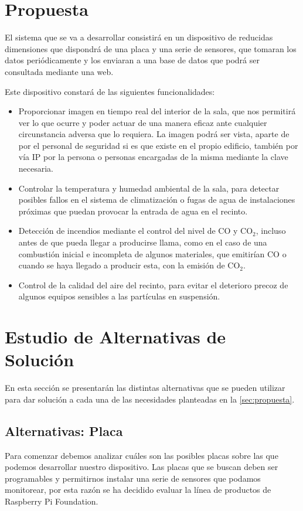 \section{Propuesta}\label{sec:propuesta}
El sistema que se va a desarrollar consistirá en un dispositivo de reducidas dimensiones que dispondrá de una placa y una serie de sensores, que tomaran los datos periódicamente y los enviaran a una base de datos que podrá ser consultada mediante una web.

Este dispositivo constará de las siguientes funcionalidades:
\begin{itemize}
	\item Proporcionar imagen en tiempo real del interior de la sala, que nos permitirá ver lo que ocurre y poder actuar de una manera eficaz ante cualquier circunstancia adversa que lo requiera. La imagen podrá ser vista, aparte de por el personal de seguridad si es que existe en el propio edificio, también por vía IP por la persona o personas encargadas de la misma mediante la clave necesaria.
	\item Controlar la temperatura y humedad ambiental de la sala, para detectar posibles fallos en el sistema de climatización o fugas de agua de instalaciones próximas que puedan provocar la entrada de agua en el recinto.
	\item Detección de incendios mediante el control del nivel de CO y CO$_2$, incluso antes de que pueda llegar a producirse llama, como en el caso de una combustión inicial e incompleta de algunos materiales, que emitirían CO o cuando se haya llegado a producir esta, con la emisión de CO$_2$.
	\item Control de la calidad del aire del recinto, para evitar el deterioro precoz de algunos equipos sensibles a las partículas en suspensión.
\end{itemize}

\section{Estudio de Alternativas de Solución}
En esta sección se presentarán las distintas alternativas que se pueden utilizar para dar solución a cada una de las necesidades planteadas en la \autoref{sec:propuesta}.

\subsection{Alternativas: Placa}\label{subsec:altPlacas}
Para comenzar debemos analizar cuáles son las posibles placas sobre las que podemos desarrollar nuestro dispositivo. Las placas que se buscan deben ser programables y permitirnos instalar una serie de sensores que podamos monitorear, por esta razón se ha decidido evaluar la línea de productos de Raspberry Pi Foundation. 

